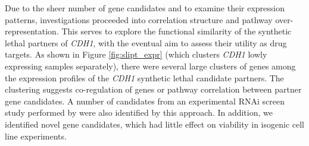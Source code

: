 Due to the sheer number of gene candidates and to examine their expression patterns, investigations proceeded into correlation structure and pathway over-represent\-ation. This serves to explore the functional similarity of the synthetic lethal partners of \textit{CDH1}, with the eventual aim to assess their utility as drug targets. As shown in Figure \ref{fig:slipt_expr} (which clusters \textit{CDH1} lowly expressing samples separately), there were several large clusters of genes among the  expression profiles of the \textit{CDH1} synthetic lethal candidate partners. The clustering suggests co-regulation of genes or pathway correlation between partner gene candidates. A number of candidates from an experimental RNAi screen study performed by \citet{Telford2015} were also identified by this approach. In addition, we identified novel gene candidates, which had little effect on viability in isogenic cell line experiments. %

